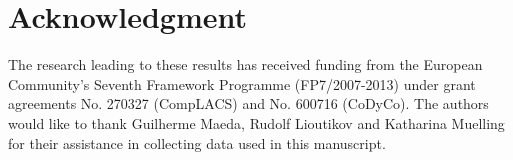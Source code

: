 \documentclass[letterpaper, 10 pt, conference]{ieeeconf}  %
\begin{document}


\section*{Acknowledgment} 

The research leading to these results has received funding from the European Community's Seventh Framework Programme (FP7/2007-2013) under grant agreements No. 270327 (CompLACS) and
 No. 600716 (CoDyCo).
The authors would like to thank Guilherme Maeda, Rudolf Lioutikov and Katharina Muelling 
for their assistance in collecting data used in this manuscript.







\end{document}
